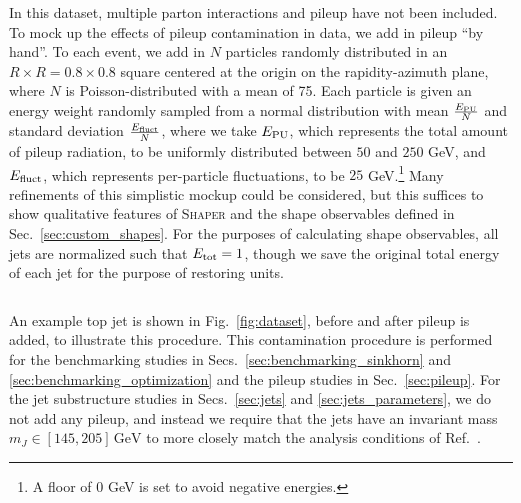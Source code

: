 \documentclass[letterpaper,11pt]{article}
\DeclareRobustCommand{\Sec}[1]{Sec.~\ref{sec:#1}}
\DeclareRobustCommand{\Secs}[2]{Secs.~\ref{sec:#1} and \ref{sec:#2}}
\DeclareRobustCommand{\Fig}[1]{Fig.~\ref{fig:#1}}
\DeclareRobustCommand{\Refer}[1]{Ref.~\cite{#1}}
\def\GeV{\text{GeV}}
\newcommand{\Shaper}{\textsc{Shaper}\xspace}
\begin{document}
In this dataset, multiple parton interactions and pileup have not been included. To mock up the effects of pileup contamination in data, we add in pileup ``by hand''. To each event, we add in $N$ particles randomly distributed in an $R\times R = 0.8\times0.8$ square centered at the origin on the rapidity-azimuth plane, where $N$ is Poisson-distributed with a mean of 75. Each particle is given an energy weight randomly sampled from a normal distribution with mean $\frac{E_{\rm PU}}{N}$ and standard deviation $\frac{E_{\rm fluct}}{N}$, where we take $E_{\rm PU}$, which represents the total amount of pileup radiation, to be uniformly distributed between $50$ and $250$ GeV, and $E_{\rm fluct}$, which represents per-particle
fluctuations, to be $25$ GeV.\footnote{A floor of 0 GeV is set to avoid negative energies.} Many refinements of this simplistic mockup could be considered, but this suffices to show qualitative features of \Shaper and the shape observables defined in \Sec{custom_shapes}. For the purposes of calculating shape observables, all jets are normalized such that $E_{\rm tot} = 1$, though we save the original total energy of each jet for the purpose of restoring units.


\begin{figure*}[t]
    \centering
    $\quad$
    \caption{
        Example of a top jet (signal) event in our dataset, (a) before and (b) after the pileup mock-up procedure described in \Sec{dataset}. Each red point is a single particle, and the size of the point is proportional to the relative energy of the particle.
        }
    \label{fig:dataset}
\end{figure*}


An example top jet is shown in \Fig{dataset}, before and after pileup is added, to illustrate this procedure.
%
This contamination procedure is performed for the benchmarking studies in \Secs{benchmarking_sinkhorn}{benchmarking_optimization} and the pileup studies in \Sec{pileup}. For the jet substructure studies in \Secs{jets}{jets_parameters}, we do not add any pileup, and instead we require that the jets have an invariant mass $m_J \in [145, 205]\,\GeV$ to more closely match the analysis conditions of \Refer{Thaler:2010tr}.
\end{document}

